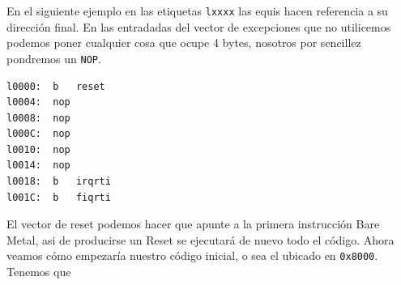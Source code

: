 En el siguiente ejemplo en las etiquetas {\tt lxxxx} las equis hacen referencia a su dirección
final. En las entradadas del vector de excepciones que no utilicemos podemos poner cualquier
cosa que ocupe 4 bytes, nosotros por sencillez pondremos un {\tt NOP}.

\begin{lstlisting}
l0000:  b   reset
l0004:  nop
l0008:  nop
l000C:  nop
l0010:  nop
l0014:  nop
l0018:  b   irqrti
l001C:  b   fiqrti
\end{lstlisting}

El vector de reset podemos hacer que apunte a la primera instrucción Bare Metal, asi de
producirse un Reset se ejecutará de nuevo todo el código. Ahora veamos cómo empezaría nuestro
código inicial, o sea el ubicado en {\tt 0x8000}. Tenemos que 


\chapterend{}

